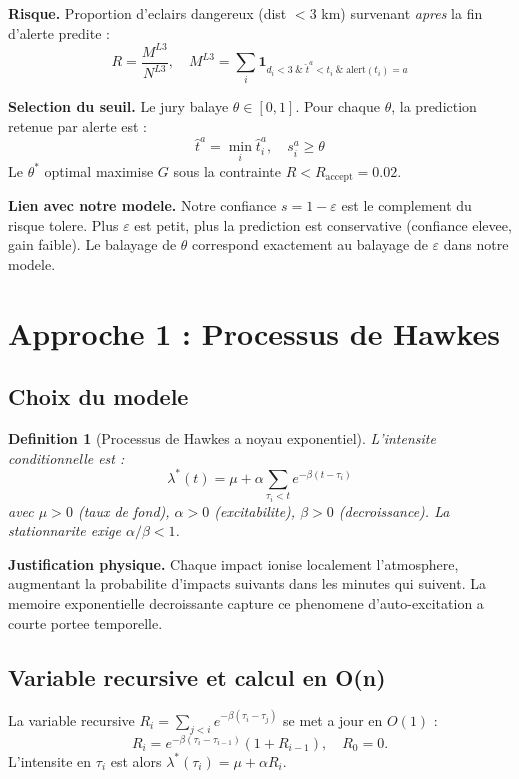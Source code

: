 \documentclass[a4paper,11pt]{article}
\newtheorem{definition}{Definition}[section]
\begin{document}
\textbf{Risque.} Proportion d'eclairs dangereux (dist $< 3$ km) survenant
\emph{apres} la fin d'alerte predite :
\[
R = \frac{M^{L3}}{N^{L3}}, \quad
M^{L3} = \sum_i \mathbf{1}_{d_i < 3 \;\&\; \hat{t}^a < t_i \;\&\; \text{alert}(t_i) = a}
\]

\textbf{Selection du seuil.} Le jury balaye $\theta \in [0, 1]$. Pour chaque
$\theta$, la prediction retenue par alerte est :
\[
\hat{t}^a = \min_i \hat{t}^a_i, \quad s^a_i \geq \theta
\]
Le $\theta^*$ optimal maximise $G$ sous la contrainte $R < R_{\text{accept}} =
0.02$.

\textbf{Lien avec notre modele.} Notre confiance $s = 1 - \varepsilon$ est le
complement du risque tolere. Plus $\varepsilon$ est petit, plus la prediction
est conservative (confiance elevee, gain faible). Le balayage de $\theta$
correspond exactement au balayage de $\varepsilon$ dans notre modele.

\section{Approche 1 : Processus de Hawkes}

\subsection{Choix du modele}

\begin{definition}[Processus de Hawkes a noyau exponentiel]
L'intensite conditionnelle est :
\[
\lambda^*(t) = \mu + \alpha \sum_{\tau_i < t} e^{-\beta(t - \tau_i)}
\]
avec $\mu > 0$ (taux de fond), $\alpha > 0$ (excitabilite), $\beta > 0$
(decroissance). La stationnarite exige $\alpha/\beta < 1$.
\end{definition}

\textbf{Justification physique.} Chaque impact ionise localement l'atmosphere,
augmentant la probabilite d'impacts suivants dans les minutes qui suivent. La
memoire exponentielle decroissante capture ce phenomene d'auto-excitation a
courte portee temporelle.

\subsection{Variable recursive et calcul en O(n)}

La variable recursive $R_i = \sum_{j < i} e^{-\beta(\tau_i - \tau_j)}$ se met
a jour en $O(1)$ :
\[
R_i = e^{-\beta(\tau_i - \tau_{i-1})}(1 + R_{i-1}), \quad R_0 = 0.
\]
L'intensite en $\tau_i$ est alors $\lambda^*(\tau_i) = \mu + \alpha R_i$.
\end{document}
